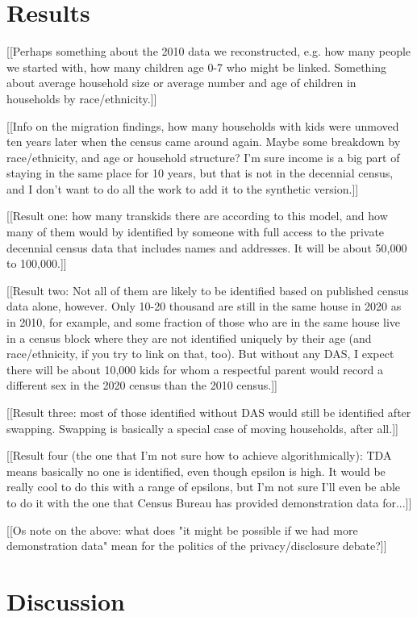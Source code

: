 \documentclass{jpc} %
\theoremstyle{plain}\newtheorem{satz}[thm]{Satz} %
\begin{document}
\section*{Results}

[[Perhaps something about the 2010 data we reconstructed, e.g. how many people we started with, how many children age 0-7 who might be linked. Something about average household size or average number and age of children in households by race/ethnicity.]]

[[Info on the migration findings, how many households with kids were unmoved ten years later when the census came around again.  Maybe some breakdown by race/ethnicity, and age or household structure?  I'm sure income is a big part of staying in the same place for 10 years, but that is not in the decennial census, and I don't want to do all the work to add it to the synthetic version.]]

[[Result one: how many transkids there are according to this model, and how many of them would by identified by someone with full access to the private decennial census data that includes names and addresses.  It will be about 50,000 to 100,000.]]

[[Result two: Not all of them are likely to be identified based on published census data alone, however.  Only 10-20 thousand are still in the same house in 2020 as in 2010, for example, and some fraction of those who are in the same house live in a census block where they are not identified uniquely by their age (and race/ethnicity, if you try to link on that, too).  But without any DAS, I expect there will be about 10,000 kids for whom a respectful parent would record a different sex in the 2020 census than the 2010 census.]]

[[Result three: most of those identified without DAS would still be identified after swapping.  Swapping is basically a special case of moving households, after all.]]

[[Result four (the one that I'm not sure how to achieve algorithmically): TDA means basically no one is identified, even though epsilon is high.  It would be really cool to do this with a range of epsilons, but I'm not sure I'll even be able to do it with the one that Census Bureau has provided demonstration data for...]]

[[Os note on the above: what does "it might be possible if we had more demonstration data" mean for the politics of the privacy/disclosure debate?]]

\section{Discussion}
\end{document}
